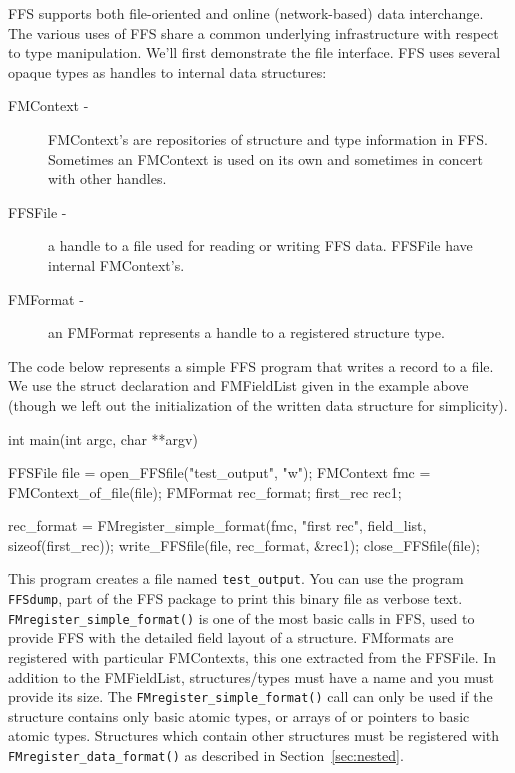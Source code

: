 FFS supports both file-oriented and online (network-based) data
interchange.  The various uses of FFS share a common underlying
infrastructure with respect to type manipulation.  We'll first demonstrate
the file interface.  FFS uses several opaque types as handles to internal
data structures:
\begin{description}
\item[FMContext -] FMContext's are repositories of structure and type
  information in FFS.   Sometimes an FMContext is used on its own and
  sometimes in concert with other handles.
\item[FFSFile -] a handle to a file used for reading or writing FFS data.
  FFSFile have internal FMContext's.
\item[FMFormat - ] an FMFormat represents a handle to a registered structure
  type.
\end{description}
The code below represents a simple FFS program that writes a record to a
file.  We use the struct declaration and FMFieldList given in the example
above (though we left out the initialization of the written data structure
for simplicity).
\begin{WrapCode}
int main(int argc, char **argv)
{
    FFSFile file = open_FFSfile("test_output", "w");
    FMContext fmc = FMContext_of_file(file);
    FMFormat rec_format;
    first_rec rec1;

    rec_format = FMregister_simple_format(fmc, "first rec", field_list, sizeof(first_rec));
    write_FFSfile(file, rec_format, &rec1);
    close_FFSfile(file);
}
\end{WrapCode}
This program creates a file named {\tt test\_output}.  You can use the
program {\tt FFSdump}, part of the FFS package to print this binary file as
verbose text.  {\tt FMregister\_simple\_format()} is one of the most basic calls
in FFS, used to provide FFS with the detailed field layout of a structure.
FMformats are registered with particular FMContexts, this one extracted from
the FFSFile.  In addition to the FMFieldList, structures/types must have a
name and you must provide its size.  The {\tt FMregister\_simple\_format()} call
can only be used if the structure contains only basic atomic types, or arrays of
or pointers to basic atomic types.  Structures which contain other
structures must be registered with {\tt FMregister\_data\_format()} as
described in Section~\ref{sec:nested}.

